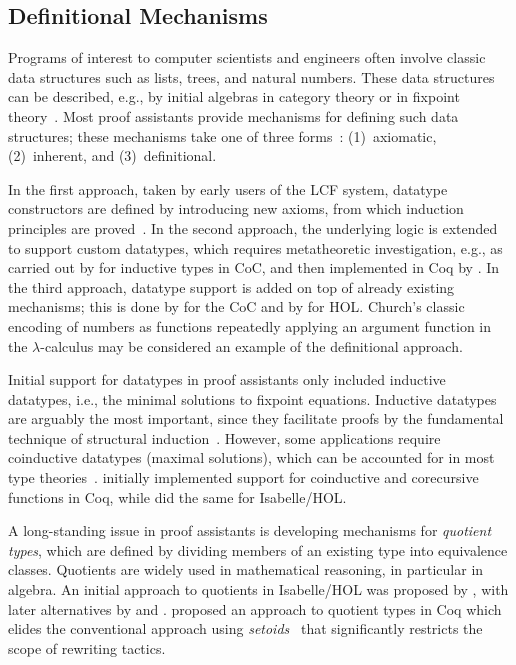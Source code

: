 \subsection{Definitional Mechanisms}
\label{sec:definitional}
%
Programs of interest to computer scientists and engineers often involve classic data structures such as lists, trees, and natural numbers. These data structures can be described, e.g., by initial algebras in category theory or in fixpoint theory~\citep{Scott1970}. Most proof assistants provide mechanisms for defining such data structures; these mechanisms take one of three forms~\citep{Berghofer1999}: (1)~axiomatic, (2)~inherent, and (3)~definitional.

In the first approach, taken by early users of the LCF system, datatype constructors are defined by introducing new axioms, from which induction principles are proved~\citep{Paulson1984}. In the second approach, the underlying logic is extended to support custom datatypes, which requires metatheoretic investigation, e.g., as carried out by \cite{Coquand1990} for inductive types in CoC, and then implemented in Coq by \cite{PaulinMohring1993}. In the third approach, datatype support is added on top of already existing mechanisms; this is done by \cite{Pfenning1990} for the CoC and by \cite{Berghofer1999} for HOL. Church's classic encoding of numbers as functions repeatedly applying an argument function in the $\lambda$-calculus may be considered an example of the definitional approach.

Initial support for datatypes in proof assistants only included inductive datatypes, i.e., the minimal solutions to fixpoint equations. Inductive datatypes are arguably the most important, since they facilitate proofs by the fundamental technique of structural induction~\citep{Burstall1969,harper2016practical}. However, some applications require coinductive datatypes (maximal solutions), which can be accounted for in most type theories~\citep{Coquand1994}. \citet{Gimenez1995} initially implemented support for coinductive and corecursive functions in Coq, while \citet{Paulson1997} did the same for Isabelle/HOL.

A long-standing issue in proof assistants is developing mechanisms for \emph{quotient types}, which are defined by dividing members of an existing type into equivalence classes. Quotients are widely used in mathematical reasoning, in particular in algebra. An initial approach to quotients in Isabelle/HOL was proposed by \cite{Slotosch1997}, with later alternatives by \cite{Paulson2006} and \cite{Huffman2013}. \cite{Cohen2013b} proposed an approach to quotient types in Coq which elides the conventional approach using \emph{setoids}~\citep{GEUVERS2002271} that significantly restricts the scope of rewriting tactics.

